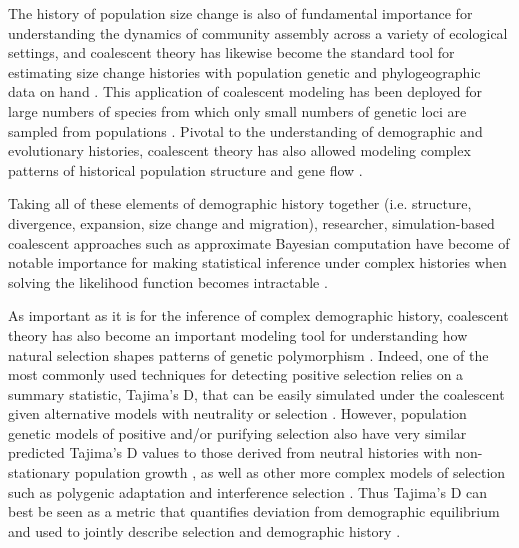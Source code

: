 \documentclass[12pt]{article}
\begin{document}
The history of population size change is also of fundamental
importance for understanding the dynamics of community assembly across
a variety of ecological settings, and coalescent theory has likewise
become the standard tool for estimating size change histories with
population genetic and phylogeographic data on hand
\citep{Kuhner1998-dp, Slatkin1991-ec}. This application of coalescent
modeling has been deployed for large numbers of species from which
only small numbers of genetic loci are sampled from populations
\citep{Drummond2005-zh}.
%
%
Pivotal to the understanding of demographic
and evolutionary histories, coalescent theory has also allowed
modeling complex patterns of historical population structure
\citep{Prado-Martinez2013-hv, Bahlo2000-cx} and gene flow
\citep{Beerli2001-mt,Hey2004-xe}.
%
%

Taking all of these elements of demographic
history together (i.e. structure, divergence, expansion, size change
and migration), researcher, simulation-based coalescent approaches
such as approximate Bayesian computation \citep{Beaumont2010-to,
  Pritchard1999-zf} have become of notable importance for making
statistical inference under complex histories when solving the
likelihood function becomes intractable \citep{Sunnaker2013-ts}.

As important as it is for the inference of complex demographic
history, coalescent theory has also become an important modeling tool
for understanding how natural selection shapes patterns of genetic
polymorphism \citep{Kim2002-ex, Kern2016-ap, Ewing2016-bm}. Indeed,
one of the most commonly used techniques for detecting positive
selection relies on a summary statistic, Tajima's D, that can be
easily simulated under the coalescent given alternative models with
neutrality or selection \citep{Tajima1989-mc}. However, population
genetic models of positive and/or purifying selection also have very
similar predicted Tajima's D values to those derived from neutral
histories with non-stationary population growth
\citep{Freedman2016-yx, Barton1998-xs, Barton2000-gr, Jensen2005-ef,
  Schrider2016-cw}, as well as other more complex models of selection
such as polygenic adaptation and interference selection
\citep{Stephan2016-lf, Good2014-fq}. Thus Tajima's D can best be seen
as a metric that quantifies deviation from demographic equilibrium and
used to jointly describe selection and demographic history
\citep{Kern2016-ap, Ewing2016-bm, Phung2016-uo, Roux2016-hz}.
\end{document}
